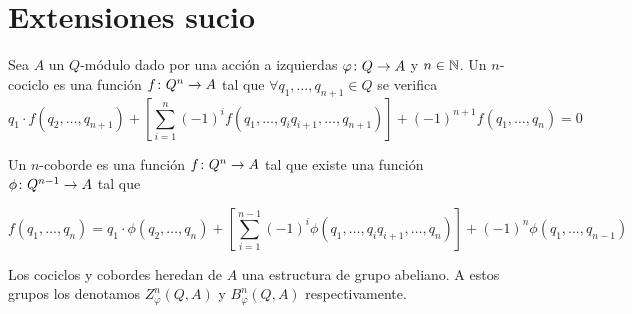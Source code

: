 
\chapter{Extensiones sucio}




\begin{definicion}
	Sea $A$ un $Q$-módulo dado por una acción a izquierdas $\varphi\colon Q\to A$ y $n\in\mathbb{N}$. 
	Un $n$-cociclo es una función $f\colon Q^n\to A$ tal que $\forall q_1,\hdots,q_{n+1}\in Q$ se verifica
	\begin{equation*}
	 q_1\cdot f(q_2,\hdots,q_{n+1}) + \left[\sum\limits_{i=1}^{n} (-1)^i f(q_1,\hdots,q_iq_{i+1},\hdots,q_{n+1}) \right] + (-1)^{n+1}f(q_1,\hdots,q_n) = 0
	\end{equation*}
	
	Un $n$-coborde es una función $f\colon Q^n\to A$ tal que existe una función $\phi\colon Q^{n-1}\to A$ tal que
	
	\begin{equation*}
		f(q_1,\hdots, q_n) = q_1\cdot \phi(q_2,\hdots,q_n) + \left[\sum\limits_{i=1}^{n-1}(-1)^{i} \phi(q_1,\hdots,q_iq_{i+1},\hdots,q_n) \right] + (-1)^n\phi(q_1,\hdots,q_{n-1})
	\end{equation*} 
	
	Los cociclos y cobordes heredan de $A$ una estructura de grupo abeliano. A estos grupos los denotamos $Z^n_\varphi(Q,A)$ y $B^n_\varphi(Q,A)$ respectivamente.
\end{definicion}

